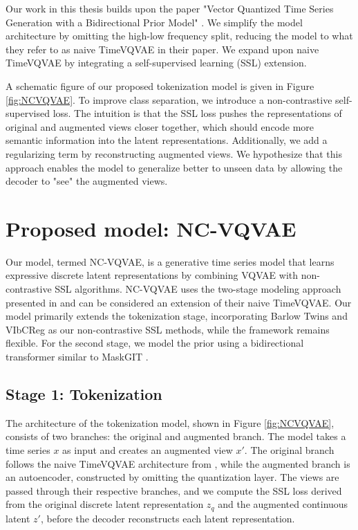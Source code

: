 \documentclass[../../thesis.tex]{subfiles}
\begin{document}
Our work in this thesis builds upon the paper "Vector Quantized Time Series Generation with a Bidirectional Prior Model" \cite{TimeVQVAE}. We simplify the model architecture by omitting the high-low frequency split, reducing the model to what they refer to as naive TimeVQVAE in their paper. We expand upon naive TimeVQVAE by integrating a self-supervised learning (SSL) extension. \newline

A schematic figure of our proposed tokenization model is given in Figure \ref{fig:NCVQVAE}. To improve class separation, we introduce a non-contrastive self-supervised loss. The intuition is that the SSL loss pushes the representations of original and augmented views closer together, which should encode more semantic information into the latent representations. Additionally, we add a regularizing term by reconstructing augmented views. We hypothesize that this approach enables the model to generalize better to unseen data by allowing the decoder to "see" the augmented views.

\section{Proposed model: NC-VQVAE}

Our model, termed NC-VQVAE, is a generative time series model that learns expressive discrete latent representations by combining VQVAE \cite{VQVAE} with non-contrastive SSL algorithms. NC-VQVAE uses the two-stage modeling approach presented in \cite{TimeVQVAE} and can be considered an extension of their naive TimeVQVAE. Our model primarily extends the tokenization stage, incorporating Barlow Twins \cite{zbontar2021barlow} and VIbCReg \cite{lee2024computer} as our non-contrastive SSL methods, while the framework remains flexible. For the second stage, we model the prior using a bidirectional transformer similar to MaskGIT \cite{chang2022maskgit}.

\subsection{Stage 1: Tokenization}

The architecture of the tokenization model, shown in Figure \ref{fig:NCVQVAE}, consists of two branches: the original and augmented branch. The model takes a time series $x$ as input and creates an augmented view $x'$. The original branch follows the naive TimeVQVAE architecture from \cite{TimeVQVAE}, while the augmented branch is an autoencoder, constructed by omitting the quantization layer. The views are passed through their respective branches, and we compute the SSL loss derived from the original discrete latent representation $z_q$ and the augmented continuous latent $z'$, before the decoder reconstructs each latent representation. \newline 
\end{document}
